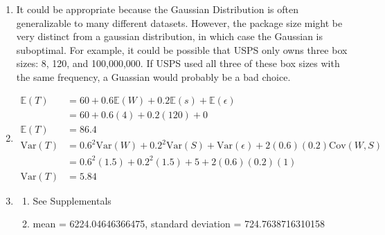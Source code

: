 \documentclass{harvardml}
\theoremstyle{definition}
\theoremstyle{plain}
\begin{document}
\begin{solution}
\begin{enumerate}
    \item It could be appropriate because the Gaussian Distribution is often generalizable to many different datasets.
    However, the package size might be very distinct from a gaussian distribution, in which case the Gaussian is suboptimal.
    For example, it could be possible that USPS only owns three box sizes: 8, 120, and 100,000,000.
    If USPS used all three of these box sizes with the same frequency, a Guassian would probably be a bad choice.
    \item 
    \begin{align*}
        \mathbb{E}(T) &= 60 + 0.6\mathbb{E}(W) + 0.2\mathbb{E}(s)+\mathbb{E}(\epsilon)\\
        &= 60 + 0.6(4) + 0.2(120) + 0\\
        \mathbb{E}(T) &= 86.4\\
        \mathrm{Var}(T) &= 0.6^2\mathrm{Var}(W)+0.2^2\mathrm{Var}(S)+\mathrm{Var}(\epsilon)+2(0.6)(0.2)\mathrm{Cov}(W,S)\\
        &= 0.6^2(1.5)+0.2^2(1.5)+5+2(0.6)(0.2)(1)\\
        \mathrm{Var}(T) &= 5.84
    \end{align*}
    \item
    \begin{enumerate}
        \item See Supplementals
        \item mean = 6224.04646366475, standard deviation = 724.7638716310158
    \end{enumerate}
\end{enumerate}
\end{solution}
\end{document}

